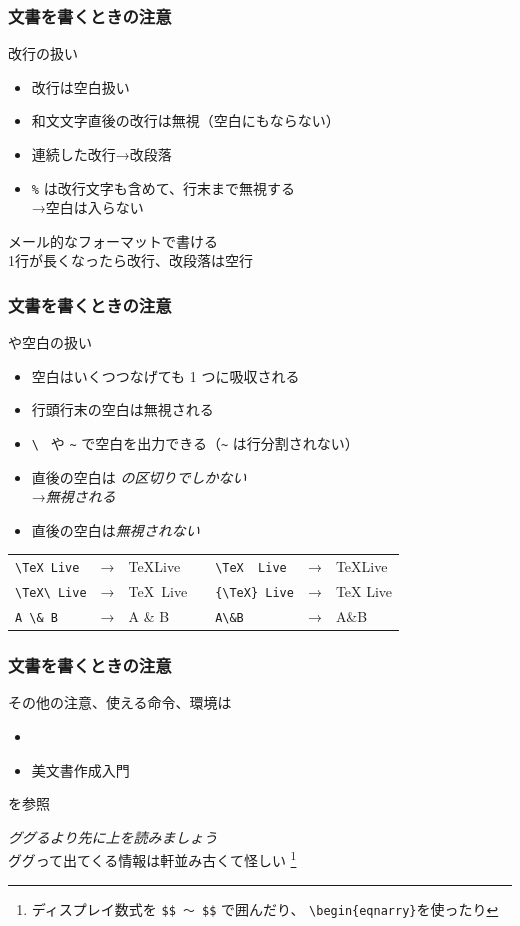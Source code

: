 \begin{frame}[fragile]
	\frametitle{文書を書くときの注意}
	\begin{block}{改行の扱い}
		\begin{itemize}
			\item 改行は空白扱い
			\item 和文文字直後の改行は無視（空白にもならない）
			\item 連続した改行→改段落
			\item \verb+%+ は改行文字も含めて、行末まで無視する\\
				→空白は入らない
		\end{itemize}
	\end{block}
	
	メール的なフォーマットで書ける\\
	{\footnotesize 1行が長くなったら改行、改段落は空行}
\end{frame}

\begin{frame}[fragile]
	\frametitle{文書を書くときの注意}
	\begin{block}{や空白の扱い}
		\begin{itemize}
			\item 空白はいくつつなげても 1 つに吸収される
			\item 行頭行末の空白は無視される
			\item \verb*+\ + や \verb+~+ で空白を出力できる（\verb+~+ は行分割されない）
			\item {}直後の空白は
				\emph{の区切りでしかない}\\
				→\emph{無視される}
			\item {}直後の空白は\emph{無視されない}
		\end{itemize}
	\end{block}
	
	\bgroup\scriptsize
	\begin{tabular}{lclclcl}
		\verb*+\TeX Live+&→&\TeX Live&\hspace*{3em}&\verb*+\TeX  Live+&→&\TeX  Live\\
		\verb*+\TeX\ Live+&→&\TeX\ Live&&\verb*+{\TeX} Live+&→&{\TeX} Live\\
		\verb*+A \& B+&→&A \& B&&\verb*+A\&B+&→&A\&B
	\end{tabular}
	\egroup
\end{frame}

\begin{frame}
	\frametitle{文書を書くときの注意}
	その他の注意、使える命令、環境は
	\begin{itemize}
		\item {}
		\item 美文書作成入門
	\end{itemize}
	を参照
	
	\emph{ググるより先に上を読みましょう}\\
	{\footnotesize ググって出てくる情報は軒並み古くて怪しい
	\footnote{ディスプレイ数式を \texttt{\$\$ 〜 \$\$} で囲んだり、
	\texttt{\textbackslash begin\{eqnarry\}}を使ったり}}
\end{frame}

